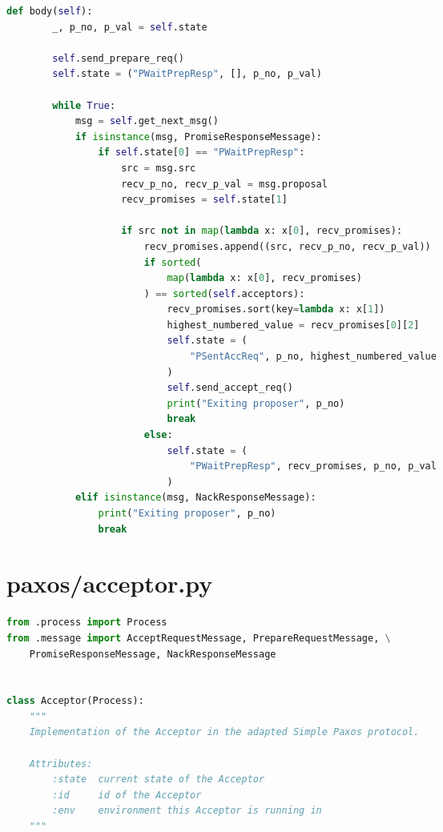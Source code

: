 \begin{landscape}
\begin{multicols*}{2}
\begin{lstlisting}[style=SourceCodeListing,language=Python]
    def body(self):
        _, p_no, p_val = self.state

        self.send_prepare_req()
        self.state = ("PWaitPrepResp", [], p_no, p_val)

        while True:
            msg = self.get_next_msg()
            if isinstance(msg, PromiseResponseMessage):
                if self.state[0] == "PWaitPrepResp":
                    src = msg.src
                    recv_p_no, recv_p_val = msg.proposal
                    recv_promises = self.state[1]

                    if src not in map(lambda x: x[0], recv_promises):
                        recv_promises.append((src, recv_p_no, recv_p_val))
                        if sorted(
                            map(lambda x: x[0], recv_promises)
                        ) == sorted(self.acceptors):
                            recv_promises.sort(key=lambda x: x[1])
                            highest_numbered_value = recv_promises[0][2]
                            self.state = (
                                "PSentAccReq", p_no, highest_numbered_value
                            )
                            self.send_accept_req()
                            print("Exiting proposer", p_no)
                            break
                        else:
                            self.state = (
                                "PWaitPrepResp", recv_promises, p_no, p_val
                            )
            elif isinstance(msg, NackResponseMessage):
                print("Exiting proposer", p_no)
                break
\end{lstlisting}
\end{multicols*}

\newpage

\section{paxos/acceptor.py}
\begin{multicols*}{2}
\begin{lstlisting}[style=SourceCodeListing,language=Python]
from .process import Process
from .message import AcceptRequestMessage, PrepareRequestMessage, \
    PromiseResponseMessage, NackResponseMessage


class Acceptor(Process):
    """
    Implementation of the Acceptor in the adapted Simple Paxos protocol.

    Attributes:
        :state  current state of the Acceptor
        :id     id of the Acceptor
        :env    environment this Acceptor is running in
    """


\end{lstlisting}
\end{multicols*}
\end{landscape}
